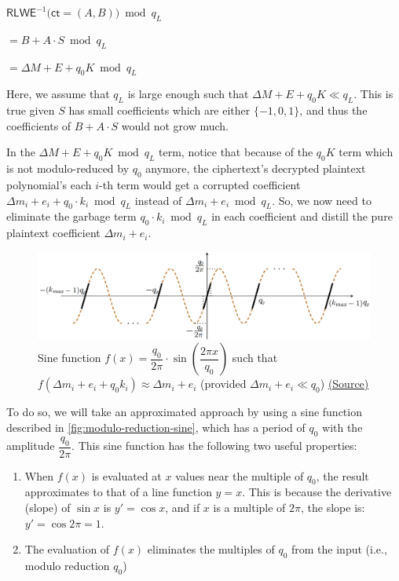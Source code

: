 $\textsf{RLWE}^{-1}\textbf{(}\textsf{ct} = (A, B)\textbf{)} \bmod q_L$

$ = B + A\cdot S \bmod q_L$

$= \Delta M + E + q_0 K \bmod q_L$

Here, we assume that $q_L$ is large enough such that $\Delta M + E + q_0K \ll q_L$. This is true given $S$ has small coefficients which are either $\{-1, 0, 1\}$, and thus the coefficients of $B + A\cdot S$ would not grow much. 


In the $\Delta M + E + q_0 K \bmod q_L$ term, notice that because of the $q_0K$ term which is not modulo-reduced by $q_0$ anymore, the ciphertext's decrypted plaintext polynomial's each $i$-th term would get a corrupted coefficient $\Delta m_i + e_i + q_0\cdot k_i \bmod q_L$ instead of $\Delta m_i + e_i \bmod q_L$. So, we now need to eliminate the garbage term $q_0\cdot k_i \bmod q_L$ in each coefficient and distill the pure plaintext coefficient $\Delta m_i + e_i$.


\begin{figure}[h!]
    \centering
  \includegraphics[width=1.0\linewidth]{figures/modulo-reduction-sine.png}
  \caption{Sine function $f(x) = \dfrac{q_0}{2\pi}\cdot \sin \left(\dfrac{2\pi x}{q_0}\right)$ such that $f(\Delta m_i + e_i + q_0k_i) \approx \Delta m_i + e_i$ (provided $\Delta m_i + e_i \ll q_0$) \href{https://eprint.iacr.org/2018/153.pdf}{(Source)}}
  \label{fig:modulo-reduction-sine}
\end{figure}

 To do so, we will take an approximated approach by using a sine function described in \autoref{fig:modulo-reduction-sine}, which has a period of $q_0$ with the amplitude $\dfrac{q_0}{2\pi}$. This sine function has the following two useful properties:
 
 \begin{enumerate}
\item When $f(x)$ is evaluated at $x$ values near the multiple of $q_0$, the result approximates to that of a line function $y = x$. This is because the derivative (slope) of $\sin x$ is $y' = \cos x$, and if $x$ is a multiple of $2\pi$, the slope is: $y' = \cos 2\pi = 1$. 
\item The evaluation of $f(x)$ eliminates the multiples of $q_0$ from the input (i.e., modulo reduction $q_0$)
\end{enumerate}


